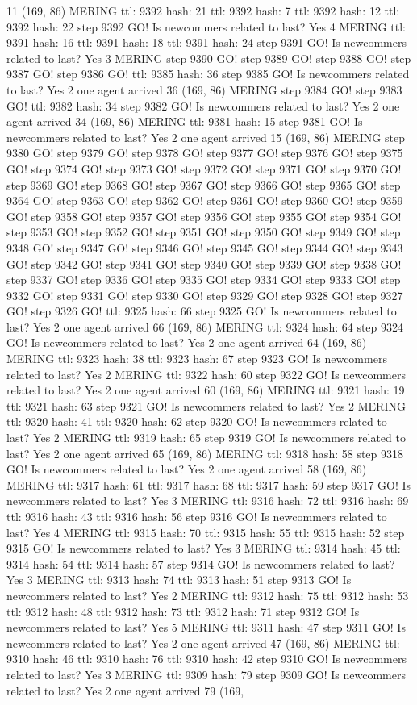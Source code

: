 11 (169, 86) MERING ttl: 9392 hash: 21 ttl: 9392 hash: 7 ttl: 9392 hash: 12 ttl: 9392 hash: 22 step 9392 GO! Is newcommers related to last? Yes 4 MERING ttl: 9391 hash: 16 ttl: 9391 hash: 18 ttl: 9391 hash: 24 step 9391 GO! Is newcommers related to last? Yes 3 MERING step 9390 GO! step 9389 GO! step 9388 GO! step 9387 GO! step 9386 GO! ttl: 9385 hash: 36 step 9385 GO! Is newcommers related to last? Yes 2 one agent arrived 36 (169, 86) MERING step 9384 GO! step 9383 GO! ttl: 9382 hash: 34 step 9382 GO! Is newcommers related to last? Yes 2 one agent arrived 34 (169, 86) MERING ttl: 9381 hash: 15 step 9381 GO! Is newcommers related to last? Yes 2 one agent arrived 15 (169, 86) MERING step 9380 GO! step 9379 GO! step 9378 GO! step 9377 GO! step 9376 GO! step 9375 GO! step 9374 GO! step 9373 GO! step 9372 GO! step 9371 GO! step 9370 GO! step 9369 GO! step 9368 GO! step 9367 GO! step 9366 GO! step 9365 GO! step 9364 GO! step 9363 GO! step 9362 GO! step 9361 GO! step 9360 GO! step 9359 GO! step 9358 GO! step 9357 GO! step 9356 GO! step 9355 GO! step 9354 GO! step 9353 GO! step 9352 GO! step 9351 GO! step 9350 GO! step 9349 GO! step 9348 GO! step 9347 GO! step 9346 GO! step 9345 GO! step 9344 GO! step 9343 GO! step 9342 GO! step 9341 GO! step 9340 GO! step 9339 GO! step 9338 GO! step 9337 GO! step 9336 GO! step 9335 GO! step 9334 GO! step 9333 GO! step 9332 GO! step 9331 GO! step 9330 GO! step 9329 GO! step 9328 GO! step 9327 GO! step 9326 GO! ttl: 9325 hash: 66 step 9325 GO! Is newcommers related to last? Yes 2 one agent arrived 66 (169, 86) MERING ttl: 9324 hash: 64 step 9324 GO! Is newcommers related to last? Yes 2 one agent arrived 64 (169, 86) MERING ttl: 9323 hash: 38 ttl: 9323 hash: 67 step 9323 GO! Is newcommers related to last? Yes 2 MERING ttl: 9322 hash: 60 step 9322 GO! Is newcommers related to last? Yes 2 one agent arrived 60 (169, 86) MERING ttl: 9321 hash: 19 ttl: 9321 hash: 63 step 9321 GO! Is newcommers related to last? Yes 2 MERING ttl: 9320 hash: 41 ttl: 9320 hash: 62 step 9320 GO! Is newcommers related to last? Yes 2 MERING ttl: 9319 hash: 65 step 9319 GO! Is newcommers related to last? Yes 2 one agent arrived 65 (169, 86) MERING ttl: 9318 hash: 58 step 9318 GO! Is newcommers related to last? Yes 2 one agent arrived 58 (169, 86) MERING ttl: 9317 hash: 61 ttl: 9317 hash: 68 ttl: 9317 hash: 59 step 9317 GO! Is newcommers related to last? Yes 3 MERING ttl: 9316 hash: 72 ttl: 9316 hash: 69 ttl: 9316 hash: 43 ttl: 9316 hash: 56 step 9316 GO! Is newcommers related to last? Yes 4 MERING ttl: 9315 hash: 70 ttl: 9315 hash: 55 ttl: 9315 hash: 52 step 9315 GO! Is newcommers related to last? Yes 3 MERING ttl: 9314 hash: 45 ttl: 9314 hash: 54 ttl: 9314 hash: 57 step 9314 GO! Is newcommers related to last? Yes 3 MERING ttl: 9313 hash: 74 ttl: 9313 hash: 51 step 9313 GO! Is newcommers related to last? Yes 2 MERING ttl: 9312 hash: 75 ttl: 9312 hash: 53 ttl: 9312 hash: 48 ttl: 9312 hash: 73 ttl: 9312 hash: 71 step 9312 GO! Is newcommers related to last? Yes 5 MERING ttl: 9311 hash: 47 step 9311 GO! Is newcommers related to last? Yes 2 one agent arrived 47 (169, 86) MERING ttl: 9310 hash: 46 ttl: 9310 hash: 76 ttl: 9310 hash: 42 step 9310 GO! Is newcommers related to last? Yes 3 MERING ttl: 9309 hash: 79 step 9309 GO! Is newcommers related to last? Yes 2 one agent arrived 79 (169, 